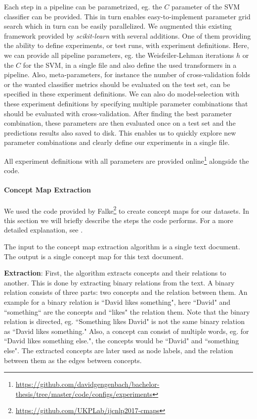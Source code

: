 Each step in a pipeline can be parametrized, eg. the $C$ parameter of the SVM classifier can be provided.
This in turn enables easy-to-implement parameter grid search which in turn can be easily parallelized.
We augmented this existing framework provided by \textit{scikit-learn} with several additions.
One of them providing the ability to define experiments, or test runs, with experiment definitions.
Here, we can provide all pipeline parameters, eg. the Weisfeiler-Lehman iterations $h$ or the $C$ for the SVM, in a single file and also define the used transformers in a pipeline.
Also, meta-parameters, for instance the number of cross-validation folds or the wanted classifier metrics should be evaluated on the test set, can be specified in these experiment definitions.
We can also do model-selection with these experiment definitions by specifying multiple parameter combinations that should be evaluated with cross-validation.
After finding the best parameter combination, these parameters are then evaluated once on a test set and the predictions results also saved to disk.
This enables us to quickly explore new parameter combinations and clearly define our experiments in a single file.

All experiment definitions with all parameters are provided online\footnote{\url{https://github.com/davidgengenbach/bachelor-thesis/tree/master/code/configs/experiments}} alongside the code.

\paragraph{Concept Map Extraction}
We used the code provided by Falke\footnote{\url{https://github.com/UKPLab/ijcnlp2017-cmaps}}  to create concept maps for our datasets.
In this section we will briefly describe the steps the code performs. For a more detailed explanation, see \cite{Falke2017}.

The input to the concept map extraction algorithm is a single text document. The output is a single concept map for this text document.

\textbf{Extraction}:
First, the algorithm extracts concepts and their relations to another.
This is done by extracting binary relations from the text. A binary relation consists of three parts: two concepts and the relation between them. An example for a binary relation is ``David likes something", here ``David" and ``something`` are the concepts and ``likes" the relation them. Note that the binary relation is directed, eg. ``Something likes David" is not the same binary relation as ``David likes something."
Also, a concept can consist of multiple words, eg. for ``David likes something else.", the concepts would be ``David" and ``something else".
The extracted concepts are later used as node labels, and the relation between them as the edges between concepts.


